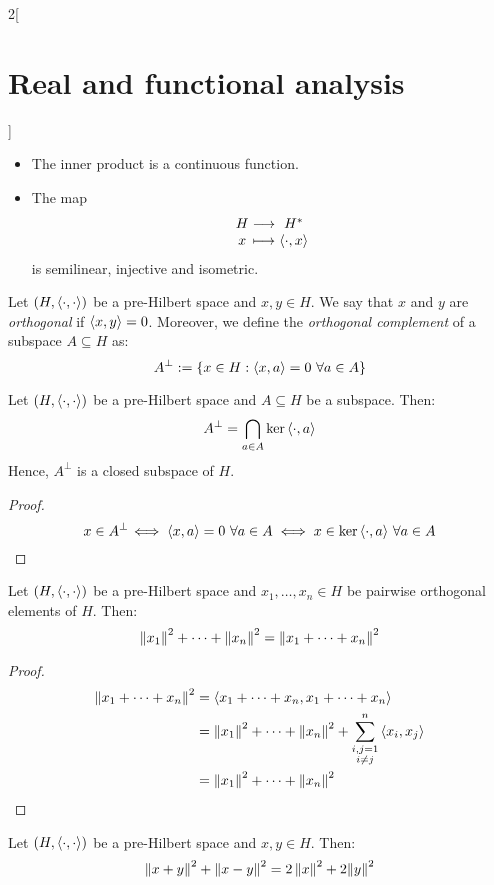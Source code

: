 \documentclass[../../../main_math.tex]{subfiles}
\begin{document}
\begin{multicols}{2}[\section{Real and functional analysis}]
\begin{proposition}
\begin{itemize}
      \item The inner product is a continuous function.
      \item The map $$\function{}{H}{H^*}{x}{\dotp{\cdot}{x}}$$ is semilinear, injective and isometric.
    \end{itemize}
  \end{proposition}
  \begin{definition}
    Let $(H,{\left\langle\cdot,\cdot\right\rangle})$ be a pre-Hilbert space and $x,y\in H$. We say that $x$ and $y$ are \emph{orthogonal} if ${\left\langle x,y\right\rangle}=0$. Moreover, we define the \emph{orthogonal complement} of a subspace $A\subseteq H$ as: $$A^\perp:=\{x\in H:\dotp{x}{a}=0\ \forall a\in A\}$$
  \end{definition}
  \begin{lemma}
    Let $(H,{\left\langle\cdot,\cdot\right\rangle})$ be a pre-Hilbert space and $A\subseteq H$ be a subspace. Then: $$A^\perp=\bigcap_{a\in A}\ker{\left\langle\cdot,a\right\rangle}$$
    Hence, $A^\perp$ is a closed subspace of $H$.
  \end{lemma}
  \begin{proof}
    $$x\in A^\perp\!\iff {\left\langle x,a\right\rangle}=0\ \forall a\in A\iff x\in\ker{\left\langle\cdot,a\right\rangle}\ \forall a\in A$$
  \end{proof}
  \begin{proposition}\label{RFA:pythagorean}
    Let $(H,{\left\langle\cdot,\cdot\right\rangle})$ be a pre-Hilbert space and $x_1,\ldots, x_n\in H$ be pairwise orthogonal elements of $H$. Then: $${\left\|x_1\right\|}^2+\cdots + {\left\|x_n\right\|}^2={\left\|x_1+\cdots+x_n\right\|}^2$$
  \end{proposition}
  \begin{proof}
    \begin{align*}
      {\left\|x_1+\cdots+x_n\right\|}^2 & = {\left\langle x_1+\cdots+x_n,x_1+\cdots+x_n\right\rangle}                       \\
                                & ={\left\|x_1\right\|}^2+\cdots + {\left\|x_n\right\|}^2+\sum_{\substack{i,j=1 \\i\ne j}}^n{\left\langle x_i,x_j\right\rangle}\\
                                & ={\left\|x_1\right\|}^2+\cdots + {\left\|x_n\right\|}^2
    \end{align*}
  \end{proof}
  \begin{lemma}\label{RFA:parallelogram}
    Let $(H,{\left\langle\cdot,\cdot\right\rangle})$ be a pre-Hilbert space and $x,y\in H$. Then: $$\left\|x+y\right\|^2+{\left\|x-y\right\|}^2=2\left\|x\right\|^2+2{\left\|y\right\|}^2$$
  \end{lemma}
  \begin{definition}

\end{definition}
\end{multicols}
\end{document}

